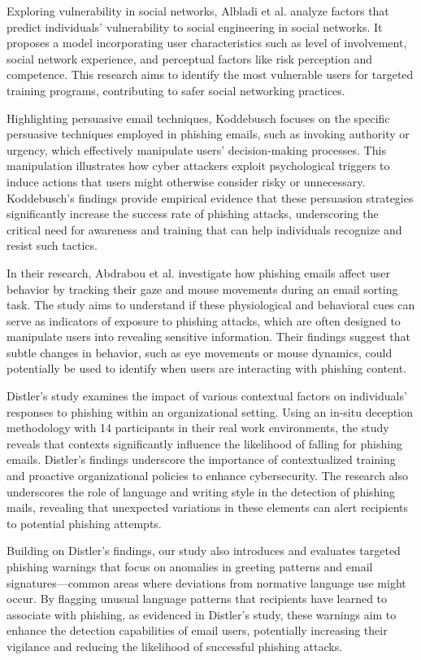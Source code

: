 \documentclass[
  a4paper,  %
  twoside,  %
  bibliography=totoc,
  headsepline,
  cleardoublepage=empty,
  parskip=half,
  draft=false
]{scrbook}
\begin{document}
Exploring vulnerability in social networks, Albladi et al. \cite{albladi} analyze factors that predict individuals' vulnerability to social engineering in social networks. It proposes a model incorporating user characteristics such as level of involvement, social network experience, and perceptual factors like risk perception and competence. This research aims to identify the most vulnerable users for targeted training programs, contributing to safer social networking practices.

Highlighting persuasive email techniques, Koddebusch \cite{koddebusch} focuses on the specific persuasive techniques employed in phishing emails, such as invoking authority or urgency, which effectively manipulate users' decision-making processes. This manipulation illustrates how cyber attackers exploit psychological triggers to induce actions that users might otherwise consider risky or unnecessary. Koddebusch's findings provide empirical evidence that these persuasion strategies significantly increase the success rate of phishing attacks, underscoring the critical need for awareness and training that can help individuals recognize and resist such tactics. 

In their research, Abdrabou et al. \cite{abdrabou} investigate how phishing emails affect user behavior by tracking their gaze and mouse movements during an email sorting task. The study aims to understand if these physiological and behavioral cues can serve as indicators of exposure to phishing attacks, which are often designed to manipulate users into revealing sensitive information. Their findings suggest that subtle changes in behavior, such as eye movements or mouse dynamics, could potentially be used to identify when users are interacting with phishing content. 

Distler's study \cite{distler} examines the impact of various contextual factors on individuals' responses to phishing within an organizational setting. Using an in-situ deception methodology with 14 participants in their real work environments, the study reveals that contexts significantly influence the likelihood of falling for phishing emails. Distler's findings underscore the importance of contextualized training and proactive organizational policies to enhance cybersecurity.  The research also underscores the role of language and writing style in the detection of phishing mails, revealing that unexpected variations in these elements can alert recipients to potential phishing attempts. 

Building on Distler's findings, our study also introduces and evaluates targeted phishing warnings that focus on anomalies in greeting patterns and email signatures—common areas where deviations from normative language use might occur. By flagging unusual language patterns that recipients have learned to associate with phishing, as evidenced in Distler’s study, these warnings aim to enhance the detection capabilities of email users, potentially increasing their vigilance and reducing the likelihood of successful phishing attacks. 
\end{document}
